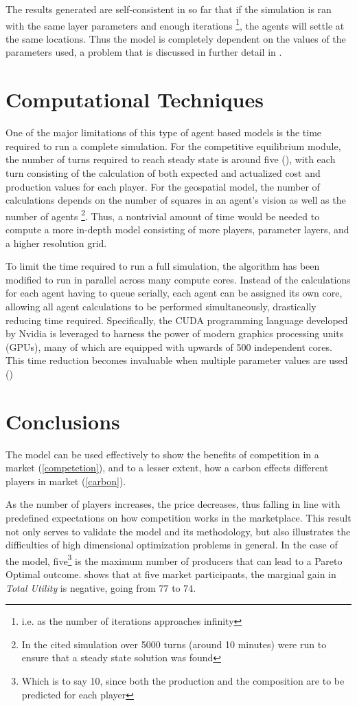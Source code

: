 \documentclass[12pt]{article}
\begin{document}
The results generated are self-consistent in so far that if the simulation is ran with the same layer parameters and enough iterations \footnote{i.e. as the number of iterations approaches infinity}, the agents will settle at the same locations. Thus the model is completely dependent on the values of the parameters used, a problem that is discussed in further detail in .


\section{Computational Techniques}
One of the major limitations of this type of agent based models is the time required to run a complete simulation. For the competitive equilibrium module, the number of turns required to reach steady state is around five (), with each turn consisting of the calculation of both expected and actualized cost and production values for each player. For the geospatial model, the number of calculations depends on the number of squares in an agent's vision as well as the number of agents \footnote{In the cited simulation over 5000 turns (around 10 minutes) were run to ensure that a steady state solution was found }. Thus, a nontrivial amount of time would be needed to compute a more in-depth model consisting of more players, parameter layers, and a higher resolution grid. \

To limit the time required to run a full simulation, the algorithm has been modified to run in parallel across many compute cores. Instead of the calculations for each agent having to queue serially, each agent can be assigned its own core, allowing all agent calculations to be performed simultaneously, drastically reducing time required. Specifically, the CUDA programming language developed by Nvidia is leveraged to harness the power of modern graphics processing units (GPUs), many of which are equipped with upwards of 500 independent cores. This time reduction becomes invaluable when multiple parameter values are used ()


\section{Conclusions}
The model can be used effectively to show the benefits of competition in a market (\cref{competetion}), and to a lesser extent, how a carbon effects different players in market (\cref{carbon}). \*

As the number of players increases, the price decreases, thus falling in line with predefined expectations on how competition works in the marketplace. This result not only serves to validate the model and its methodology, but also illustrates the difficulties of high dimensional optimization problems in general. In the case of the model, five\footnote{Which is to say 10, since both the production and the composition are to be predicted for each player} is the maximum number of producers that can lead to a Pareto Optimal outcome.  shows that at five market participants, the marginal gain in \emph{Total Utility} is negative, going from $77$ to $74$. 
\end{document}
